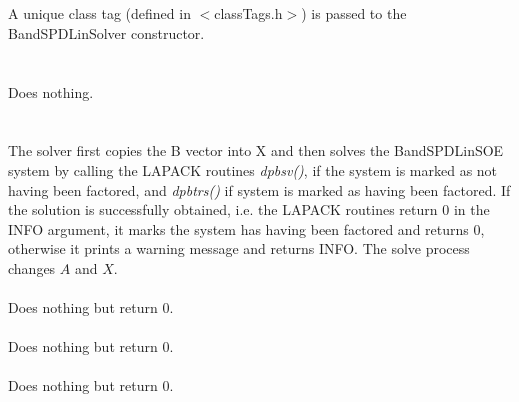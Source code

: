   \\
  \\
A unique class tag (defined in $<$classTags.h$>$) is passed to the
BandSPDLinSolver constructor. \\


 \\
\\ 
Does nothing. \\

  \\
 \\
The solver first copies the B vector into X and then solves the
BandSPDLinSOE system by calling the LAPACK routines {\em 
dpbsv()}, if the system is marked as not having been factored,
and {\em dpbtrs()} if system is marked as having been factored. 
If the solution is successfully obtained, i.e. the LAPACK routines
return $0$ in the INFO argument, it marks the system has having been 
factored and returns $0$, otherwise it prints a warning message and
returns INFO. The solve process changes $A$ and $X$. \\   


 \\
Does nothing but return $0$. \\

 \\ 
Does nothing but return $0$. \\

 \\ 
Does nothing but return $0$. \\



